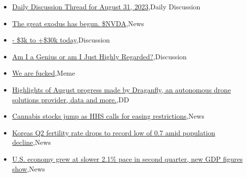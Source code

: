 \documentclass{article}%
\begin{document}
%
\begin{itemize}%
\item%
\href{https://reddit.com/r/wallstreetbets/comments/1666vnj/daily\_discussion\_thread\_for\_august\_31\_2023/}{Daily Discussion Thread for August 31, 2023},Daily Discussion%
\item%
\href{https://reddit.com/r/wallstreetbets/comments/1666cb1/the\_great\_exodus\_has\_begun\_nvda/}{The great exodus has begun. \$NVDA},News%
\item%
\href{https://reddit.com/r/wallstreetbets/comments/1663lm1/3k\_to\_30k\_today/}{- \$3k to +\$30k today},Discussion%
\item%
\href{https://reddit.com/r/wallstreetbets/comments/1663lj4/am\_i\_a\_genius\_or\_am\_i\_just\_highly\_regarded/}{Am I a Genius or am I Just Highly Regarded?},Discussion%
\item%
\href{https://reddit.com/r/wallstreetbets/comments/1662qhm/we\_are\_fucked/}{We are fucked},Meme%
\item%
\href{https://reddit.com/r/Baystreetbets/comments/1665qus/highlights\_of\_august\_progress\_made\_by\_draganfly/}{Highlights of August progress made by Draganfly, an autonomous drone solutions provider, data and more.},DD%
\item%
\href{https://reddit.com/r/StockMarket/comments/165lmue/cannabis\_stocks\_jump\_as\_hhs\_calls\_for\_easing/}{Cannabis stocks jump as HHS calls for easing restrictions},News%
\item%
\href{https://reddit.com/r/Economics/comments/1662hn9/koreas\_q2\_fertility\_rate\_drops\_to\_record\_low\_of/}{Koreas Q2 fertility rate drops to record low of 0.7 amid population decline},News%
\item%
\href{https://reddit.com/r/Economics/comments/165gkai/us\_economy\_grew\_at\_slower\_21\_pace\_in\_second/}{U.S. economy grew at slower 2.1\% pace in second quarter, new GDP figures show},News%
\end{itemize}%
\end{document}
